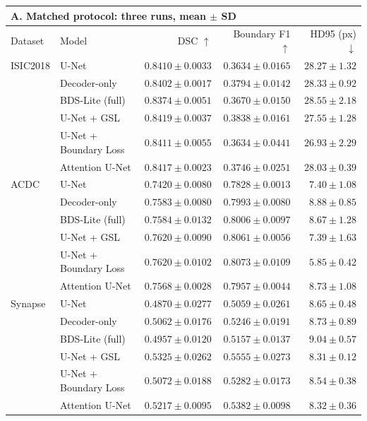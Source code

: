 \begin{tabular}{llrrr}
\toprule
\multicolumn{5}{l}{\textbf{A. Matched protocol: three runs, mean $\pm$ SD}} \\
\midrule
Dataset & Model & DSC $\uparrow$ & Boundary F1 $\uparrow$ & HD95 (px) $\downarrow$ \\
\midrule
ISIC2018 & U-Net & $0.8410 \pm 0.0033$ & $0.3634 \pm 0.0165$ & $28.27 \pm 1.32$ \\
 & Decoder-only & $0.8402 \pm 0.0017$ & $0.3794 \pm 0.0142$ & $28.33 \pm 0.92$ \\
 & BDS-Lite (full) & $0.8374 \pm 0.0051$ & $0.3670 \pm 0.0150$ & $28.55 \pm 2.18$ \\
 & U-Net + GSL & $0.8419 \pm 0.0037$ & $0.3838 \pm 0.0161$ & $27.55 \pm 1.28$ \\
 & U-Net + Boundary Loss & $0.8411 \pm 0.0055$ & $0.3634 \pm 0.0441$ & $26.93 \pm 2.29$ \\
 & Attention U-Net & $0.8417 \pm 0.0023$ & $0.3746 \pm 0.0251$ & $28.03 \pm 0.39$ \\
\addlinespace
ACDC & U-Net & $0.7420 \pm 0.0080$ & $0.7828 \pm 0.0013$ & $7.40 \pm 1.08$ \\
 & Decoder-only & $0.7583 \pm 0.0080$ & $0.7993 \pm 0.0080$ & $8.88 \pm 0.85$ \\
 & BDS-Lite (full) & $0.7584 \pm 0.0132$ & $0.8006 \pm 0.0097$ & $8.67 \pm 1.28$ \\
 & U-Net + GSL & $0.7620 \pm 0.0090$ & $0.8061 \pm 0.0056$ & $7.39 \pm 1.63$ \\
 & U-Net + Boundary Loss & $0.7620 \pm 0.0102$ & $0.8073 \pm 0.0109$ & $5.85 \pm 0.42$ \\
 & Attention U-Net & $0.7568 \pm 0.0028$ & $0.7957 \pm 0.0044$ & $8.73 \pm 1.08$ \\
\addlinespace
Synapse & U-Net & $0.4870 \pm 0.0277$ & $0.5059 \pm 0.0261$ & $8.65 \pm 0.48$ \\
 & Decoder-only & $0.5062 \pm 0.0176$ & $0.5246 \pm 0.0191$ & $8.73 \pm 0.89$ \\
 & BDS-Lite (full) & $0.4957 \pm 0.0120$ & $0.5157 \pm 0.0137$ & $9.04 \pm 0.57$ \\
 & U-Net + GSL & $0.5325 \pm 0.0262$ & $0.5555 \pm 0.0273$ & $8.31 \pm 0.12$ \\
 & U-Net + Boundary Loss & $0.5072 \pm 0.0188$ & $0.5282 \pm 0.0173$ & $8.54 \pm 0.38$ \\
 & Attention U-Net & $0.5217 \pm 0.0095$ & $0.5382 \pm 0.0098$ & $8.32 \pm 0.36$ \\

\end{tabular}
